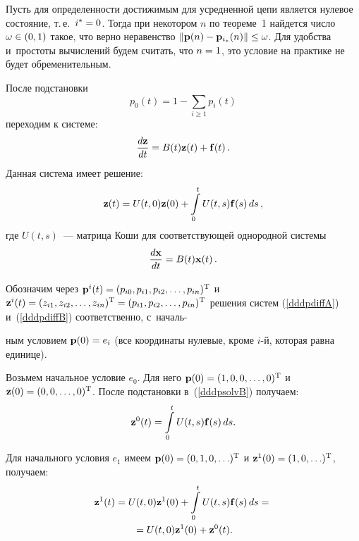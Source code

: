 \begin{multicols}{2}
Пусть для определенности достижимым для усредненной цепи является
нулевое состояние, т.\,е.\ $i^*\hm = 0$. Тогда при некотором $n$ по
теореме~1 найдет\-ся число $\omega \hm\in (0,1)$ такое, что
верно неравенство $\|{\bf p}(n) \hm- \mathbf{p}_{i_*}(n)\|\hm\le \omega$. 
Для
удобства и~простоты вычислений будем считать, что $n\hm=1$, это условие
на практике не будет обременительным.

После подстановки 
$$
p_0(t)=1-\sum\limits_{i\ge 1} p_i(t)
$$ 
переходим к
системе:
\begin{equation}
\displaystyle\frac{\displaystyle d{\mathbf z}\mathstrut}{\displaystyle dt\mathstrut}=B(t){\mathbf z}(t)+{\mathbf f}(t)\,. 
\label{dddpdiffB}
\end{equation}
%
Данная система имеет решение:
\begin{equation}
{\mathbf z}(t)=U(t,0){\mathbf z}(0)+\int\limits_0^t U(t,s) {\mathbf f}(s) \, ds\,,
\label{dddpsolvB}
\end{equation}
где $U(t,s)$~--- матрица Коши для соответствующей
однородной системы
\begin{equation*}
\displaystyle\frac{\displaystyle d\mathbf{x}\mathstrut}{\displaystyle dt\mathstrut}=B(t)\mathbf{x}(t)\,. 
\end{equation*}

Обозначим через 
$\mathbf{p}^i(t)\hm=(p_{i0},p_{i1},p_{i2},\ldots,p_{in})^{\mathrm{T}}$ 
и~$\vz^i(t\hm)=(z_{i1},z_{i2},\ldots,z_{in})^{\mathrm{T}}\hm=(p_{i1},p_{i2},\ldots,p_{
in})^{\mathrm{T}}$
решения систем (\ref{dddpdiffA}) и~(\ref{dddpdiffB})
соответственно, с~началь-\linebreak\vspace*{-12pt}

\pagebreak

\noindent
ным условием $\mathbf{p}(0)\hm=e_i$ (все 
координаты
нулевые, кроме $i$-й, которая равна единице).

Возьмем начальное условие $e_0$. Для него
$\mathbf{p}(0)\hm=(1,0,0,\ldots,0)^{\mathrm{T}}$ и~$\vz(0)\hm=(0,0,\ldots,0)^{\mathrm{T}}$. 
После
подстановки в~(\ref{dddpsolvB}) получаем:
\begin{equation*}
{\mathbf z}^0(t)=\int\limits_0^t U(t,s){\mathbf f}(s) \, ds.
\end{equation*}

Для начального условия $e_1$ имеем $\mathbf{p}(0)\hm=(0,1,0,\ldots)^{\mathrm{T}}$ и
$\vz^1(0)\hm=(1,0,\ldots)^{\mathrm{T}}$, получаем:
\begin{multline*}
{\mathbf z}^1(t)=U(t,0){\mathbf z}^1(0)+\int\limits_0^t U(t,s){\mathbf f}(s) \,
ds={}\\
{}=U(t,0){\mathbf z}^1(0)+{\mathbf z}^0(t).
\end{multline*}


\end{multicols}
